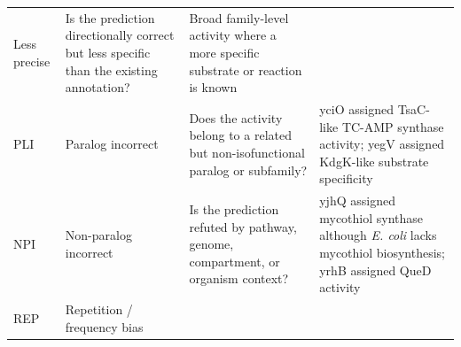 \documentclass[
  11pt,
]{article}
\begin{document}
\begin{longtable}[]{@{}llll@{}}
\begin{minipage}[t]{0.22\columnwidth}
Less precise\strut
\end{minipage} & \begin{minipage}[t]{0.22\columnwidth}\raggedright
Is the prediction directionally correct but less specific than the
existing annotation?\strut
\end{minipage} & \begin{minipage}[t]{0.22\columnwidth}\raggedright
Broad family-level activity where a more specific substrate or reaction
is known\strut
\end{minipage}\tabularnewline
\begin{minipage}[t]{0.22\columnwidth}\raggedright
PLI\strut
\end{minipage} & \begin{minipage}[t]{0.22\columnwidth}\raggedright
Paralog incorrect\strut
\end{minipage} & \begin{minipage}[t]{0.22\columnwidth}\raggedright
Does the activity belong to a related but non-isofunctional paralog or
subfamily?\strut
\end{minipage} & \begin{minipage}[t]{0.22\columnwidth}\raggedright
yciO assigned TsaC-like TC-AMP synthase activity; yegV assigned
KdgK-like substrate specificity\strut
\end{minipage}\tabularnewline
\begin{minipage}[t]{0.22\columnwidth}\raggedright
NPI\strut
\end{minipage} & \begin{minipage}[t]{0.22\columnwidth}\raggedright
Non-paralog incorrect\strut
\end{minipage} & \begin{minipage}[t]{0.22\columnwidth}\raggedright
Is the prediction refuted by pathway, genome, compartment, or organism
context?\strut
\end{minipage} & \begin{minipage}[t]{0.22\columnwidth}\raggedright
yjhQ assigned mycothiol synthase although \emph{E. coli} lacks mycothiol
biosynthesis; yrhB assigned QueD activity\strut
\end{minipage}\tabularnewline
\begin{minipage}[t]{0.22\columnwidth}\raggedright
REP\strut
\end{minipage} & \begin{minipage}[t]{0.22\columnwidth}\raggedright
Repetition / frequency bias\strut
\end{minipage} & \begin{minipage}[t]{0.22\columnwidth}\raggedright

\end{minipage}
\end{longtable}
\end{document}
